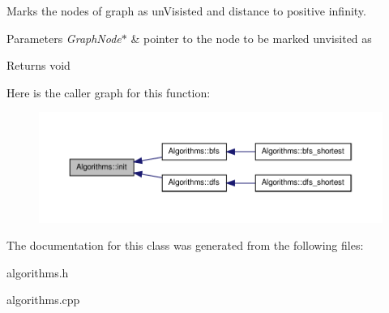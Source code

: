 \-Marks the nodes of graph as un\-Visisted and distance to positive infinity. 


\begin{DoxyParams}{\-Parameters}
{\em \-Graph\-Node$\ast$} & pointer to the node to be marked unvisited as \\
\hline
\end{DoxyParams}
\begin{DoxyReturn}{\-Returns}
void 
\end{DoxyReturn}


\-Here is the caller graph for this function\-:\nopagebreak
\begin{figure}[H]
\begin{center}
\leavevmode
\includegraphics[width=350pt]{classAlgorithms_af0154806d5c01828df47d898cfa87d51_icgraph}
\end{center}
\end{figure}




\-The documentation for this class was generated from the following files\-:\begin{DoxyCompactItemize}
\item 
algorithms.\-h\item 
algorithms.\-cpp\end{DoxyCompactItemize}
